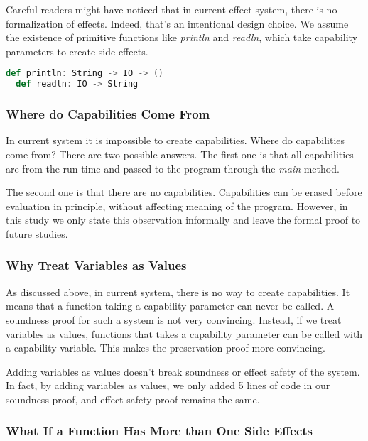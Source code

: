 Careful readers might have noticed that in current effect system,
there is no formalization of effects. Indeed, that's an intentional
design choice. We assume the existence of primitive functions like
\emph{println} and \emph{readln}, which take capability parameters to
create side effects.

\begin{lstlisting}[language=Scala]
  def println: String -> IO -> ()
  def readln: IO -> String
\end{lstlisting}



\subsubsection{Where do Capabilities Come From}

In current system it is impossible to create capabilities. Where do
capabilities come from?  There are two possible answers. The first one
is that all capabilities are from the run-time and passed to the
program through the \emph{main} method.

The second one is that there are no capabilities. Capabilities can be
erased before evaluation in principle, without affecting meaning of
the program. However, in this study we only state this observation
informally and leave the formal proof to future studies.

\subsubsection{Why Treat Variables as Values}

As discussed above, in current system, there is no way to create
capabilities. It means that a function taking a capability parameter
can never be called. A soundness proof for such a system is not very
convincing. Instead, if we treat variables as values, functions that
takes a capability parameter can be called with a capability
variable. This makes the preservation proof more convincing.

Adding variables as values doesn't break soundness or effect safety of
the system. In fact, by adding variables as values, we only added 5
lines of code in our soundness proof, and effect safety proof remains
the same.

\subsubsection{What If a Function Has More than One Side Effects}

